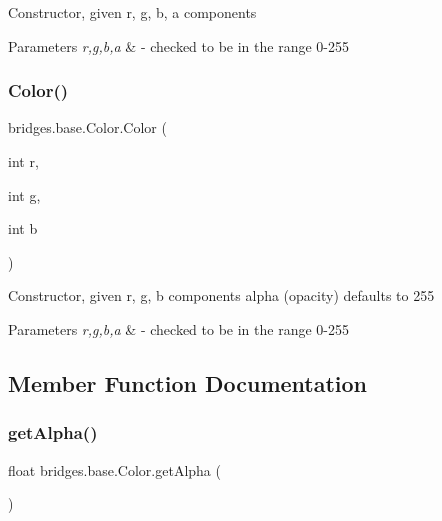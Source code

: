 Constructor, given r, g, b, a components


\begin{DoxyParams}{Parameters}
{\em r,g,b,a} & -\/ checked to be in the range 0-\/255 \\
\hline
\end{DoxyParams}
\hypertarget{classbridges_1_1base_1_1_color_a5fab564fa4eec8bece64f847ebd42948}{}\label{classbridges_1_1base_1_1_color_a5fab564fa4eec8bece64f847ebd42948} 
\subsubsection{\texorpdfstring{Color()}{Color()}\hspace{0.1cm}{\footnotesize\ttfamily [3/3]}}
{\footnotesize\ttfamily bridges.\+base.\+Color.\+Color (\begin{DoxyParamCaption}\item[{int}]{r,  }\item[{int}]{g,  }\item[{int}]{b }\end{DoxyParamCaption})}

Constructor, given r, g, b components alpha (opacity) defaults to 255


\begin{DoxyParams}{Parameters}
{\em r,g,b,a} & -\/ checked to be in the range 0-\/255 \\
\hline
\end{DoxyParams}


\subsection{Member Function Documentation}
\hypertarget{classbridges_1_1base_1_1_color_a7c4247e31ecd8fcc61ef208d5deefe68}{}\label{classbridges_1_1base_1_1_color_a7c4247e31ecd8fcc61ef208d5deefe68} 
\subsubsection{\texorpdfstring{get\+Alpha()}{getAlpha()}}
{\footnotesize\ttfamily float bridges.\+base.\+Color.\+get\+Alpha (\begin{DoxyParamCaption}{ }\end{DoxyParamCaption})}

